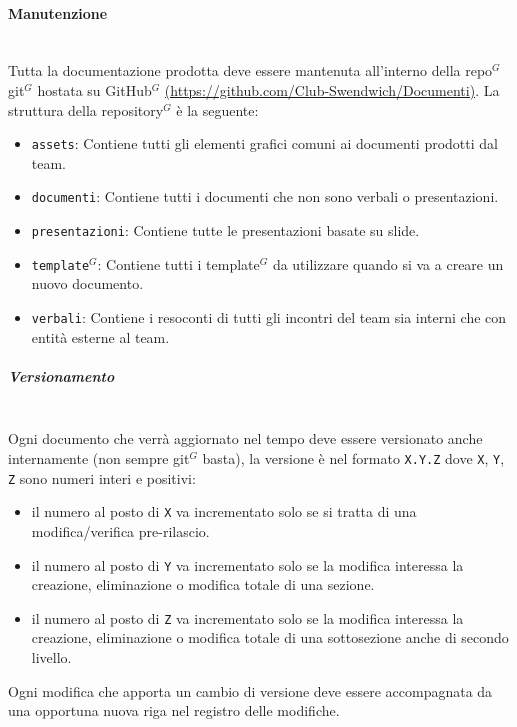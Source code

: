 \paragraph{Manutenzione}
\mbox{}\\
Tutta la documentazione prodotta deve essere mantenuta all'interno della repo$^G$  git$^G$  hostata su GitHub$^G$  \href{https://github.com/Club-Swendwich/Documenti}{(https://github.com/Club-Swendwich/Documenti)}.
La struttura della repository$^G$  è la seguente:
\begin{itemize}
    \item \texttt{assets}: Contiene tutti gli elementi grafici comuni ai documenti
        prodotti dal team.
    \item \texttt{documenti}: Contiene tutti i documenti che non sono verbali o
        presentazioni.
    \item \texttt{presentazioni}: Contiene tutte le presentazioni basate su slide.
    \item \texttt{template$^G$}: Contiene tutti i template$^G$ da utilizzare quando si va a
        creare un nuovo documento.
    \item \texttt{verbali}: Contiene i resoconti di tutti gli incontri del team sia
        interni che con entità esterne al team.
\end{itemize}

\subparagraph{Versionamento}
\mbox{}\\
Ogni documento che verrà aggiornato nel tempo deve essere versionato anche
internamente (non sempre git$^G$  basta), la versione è nel formato \texttt{X.Y.Z} dove
\texttt{X}, \texttt{Y}, \texttt{Z} sono numeri interi e positivi:
\begin{itemize}
    \item il numero al posto di \texttt{X} va incrementato solo se si tratta di una
    modifica/verifica pre-rilascio.
    \item il numero al posto di \texttt{Y} va incrementato solo se la modifica
    interessa la creazione, eliminazione o modifica totale di una sezione.
    \item il numero al posto di \texttt{Z} va incrementato solo se la modifica
    interessa la creazione, eliminazione o modifica totale di una sottosezione
    anche di secondo livello.
\end{itemize}
Ogni modifica che apporta un cambio di versione deve essere accompagnata da una
opportuna nuova riga nel registro delle modifiche.
\\

